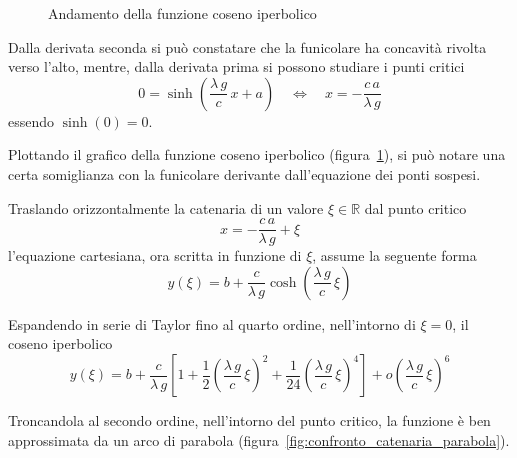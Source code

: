 \begin{figure}
  \centering
  
   \caption{Andamento della funzione coseno iperbolico}
   \label{fig:andamento_coseno_iperbolico}
  
 \end{figure}

Dalla derivata seconda si può constatare che la funicolare ha concavità rivolta verso l'alto, mentre, dalla derivata prima si possono studiare i punti critici
\[
 0 = \sinh\left(\dfrac{\lambda\,g}{c}\,x +a\right) \quad \Longleftrightarrow \quad x = -\dfrac{c\,a}{\lambda\,g}
\]
essendo $\sinh(0) = 0$.

Plottando il grafico della funzione coseno iperbolico (figura~\ref{fig:andamento_coseno_iperbolico}), si può notare una certa somiglianza con la funicolare derivante dall'equazione dei ponti sospesi.

Traslando orizzontalmente la catenaria di un valore $\xi\in\mathbb{R}$ dal punto critico 
\[x = -\dfrac{c\,a}{\lambda\,g} + \xi\]
l'equazione cartesiana, ora scritta in funzione di $\xi$, assume la seguente forma
\[
 y(\xi) = b + \dfrac{c}{\lambda\,g}\cosh\left(\dfrac{\lambda\,g}{c}\,\xi\right)
\]

Espandendo in serie di Taylor fino al quarto ordine, nell'intorno di $\xi = 0$, il coseno iperbolico
\[
 y(\xi) = b + \dfrac{c}{\lambda\,g}\left[1 + \dfrac{1}{2}\left(\dfrac{\lambda\,g}{c}\,\xi\right)^2 + \dfrac{1}{24}\left(\dfrac{\lambda\,g}{c}\,\xi\right)^4 \right] + o\left(\dfrac{\lambda\,g}{c}\,\xi\right)^6
\]

Troncandola al secondo ordine, nell'intorno del punto critico, la funzione è ben approssimata da un arco di parabola (figura~\ref{fig:confronto_catenaria_parabola}).



